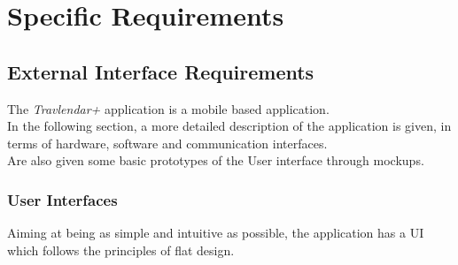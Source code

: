 \section{Specific Requirements}

\subsection{External Interface Requirements}
The \textit{Travlendar+} application is a mobile based application.\\
In the following section, a more detailed description of the application is given, in terms of hardware, software and communication interfaces.\\
Are also given some basic prototypes of the User interface through mockups.
\subsubsection{User Interfaces}
Aiming at being as simple and intuitive as possible, the application has a UI which follows the principles of flat design.


